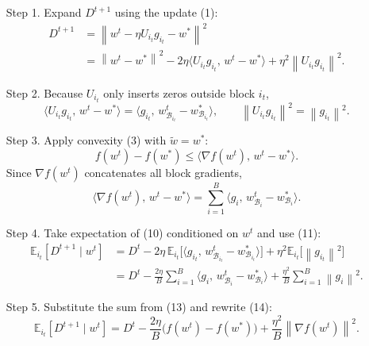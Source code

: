 \documentclass[11pt]{article}
\newcommand{\E}{\mathbb{E}}
\newcommand{\norm}[1]{\left\|#1\right\|}
\begin{document}
\begin{enumerate}
\item[Step 1.] Expand $D^{t+1}$ using the update (1):
\[
\begin{aligned}
D^{t+1}
&=\norm{w^{t}-\eta U_{i_{t}}g_{i_{t}}-w^{*}}^{2}\\
&=\norm{w^{t}-w^{*}}^{2}
-2\eta\langle U_{i_{t}}g_{i_{t}},\,w^{t}-w^{*}\rangle
+\eta^{2}\norm{U_{i_{t}}g_{i_{t}}}^{2}.
\end{aligned}
\tag{10}
\]
\item[Step 2.] Because $U_{i_{t}}$ only inserts zeros outside block $i_{t}$,
\[
\langle U_{i_{t}}g_{i_{t}},\,w^{t}-w^{*}\rangle
= \langle g_{i_{t}},\,w^{t}_{\mathcal{B}_{i_{t}}}-w^{*}_{\mathcal{B}_{i_{t}}}\rangle,
\qquad
\norm{U_{i_{t}}g_{i_{t}}}^{2}= \norm{g_{i_{t}}}^{2}.
\tag{11}
\]

\item[Step 3.] Apply convexity (3) with $\tilde w = w^{*}$:
\[
f(w^{t})-f(w^{*})\le\langle \nabla f(w^{t}),\,w^{t}-w^{*}\rangle.
\tag{12}
\]
Since $\nabla f(w^{t})$ concatenates all block gradients,
\[
\langle \nabla f(w^{t}),\,w^{t}-w^{*}\rangle
= \sum_{i=1}^{B}\langle g_{i},\,w^{t}_{\mathcal{B}_{i}}-w^{*}_{\mathcal{B}_{i}}\rangle .
\tag{13}
\]

\item[Step 4.] Take expectation of (10) conditioned on $w^{t}$ and use (11):
\[
\begin{aligned}
\E_{i_{t}}[D^{t+1}\mid w^{t}]
&= D^{t}
-2\eta\,\E_{i_{t}}\!\bigl[\langle g_{i_{t}},\,w^{t}_{\mathcal{B}_{i_{t}}}-w^{*}_{\mathcal{B}_{i_{t}}}\rangle\bigr]
+\eta^{2}\E_{i_{t}}\!\bigl[\norm{g_{i_{t}}}^{2}\bigr]\\
&= D^{t}
-\frac{2\eta}{B}\sum_{i=1}^{B}\langle g_{i},\,w^{t}_{\mathcal{B}_{i}}-w^{*}_{\mathcal{B}_{i}}\rangle
+\frac{\eta^{2}}{B}\sum_{i=1}^{B}\norm{g_{i}}^{2}.
\end{aligned}
\tag{14}
\]

\item[Step 5.] Substitute the sum from (13) and rewrite (14):
\[
\E_{i_{t}}[D^{t+1}\mid w^{t}]
= D^{t}
-\frac{2\eta}{B}\bigl(f(w^{t})-f(w^{*})\bigr)
+\frac{\eta^{2}}{B}\norm{\nabla f(w^{t})}^{2}.
\tag{15}
\]


\end{enumerate}
\end{document}
